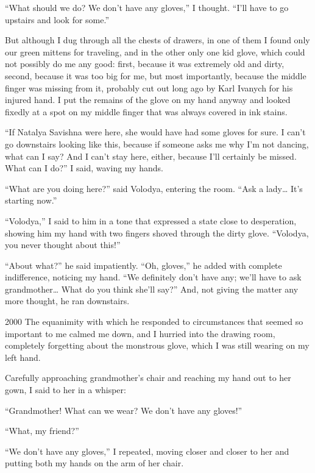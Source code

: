 ``What should we do? We don't have any gloves,'' I thought. ``I'll have to go upstairs and look for some.'' %

But although I dug through all the chests of drawers, in one of them I found only our green mittens for traveling, and in the other only one kid glove, which could not possibly do me any good: first, because it was extremely old and dirty, second, because it was too big for me, but most importantly, because the middle finger was missing from it, probably cut out long ago by Karl Ivanych for his injured hand. I put the remains of the glove on my hand anyway and looked fixedly at a spot on my middle finger that was always covered in ink stains.

``If Natalya Savishna were here, she would have had some gloves for sure. I can't go downstairs looking like this, because if someone asks me why I'm not dancing, what can I say? And I can't stay here, either, because I'll certainly be missed. What can I do?'' I said, waving my hands. %

``What are you doing here?'' said Volodya, entering the room. ``Ask a lady\ldots{} It's starting now.'' %

``Volodya,'' I said to him in a tone that expressed a state close to desperation, showing him my hand with two fingers shoved through the dirty glove. ``Volodya, you never thought about this!'' %

``About what?'' he said impatiently. ``Oh, gloves,'' he added with complete indifference, noticing my hand. ``We definitely don't have any; we'll have to ask grandmother\ldots{} What do you think she'll say?'' And, not giving the matter any more thought, he ran downstairs. %

\begin{tolerant}{2000}
The equanimity with which he responded to circumstances that seemed so important to me calmed me down, and I hurried into the drawing room, completely forgetting about the monstrous glove, which I was still wearing on my left hand.
\end{tolerant}

Carefully approaching grandmother's chair and reaching my hand out to her gown, I said to her in a whisper:

``Grandmother! What can we wear? We don't have any gloves!'' %

``What, my friend?'' %

``We don't have any gloves,'' I repeated, moving closer and closer to her and putting both my hands on the arm of her chair.

